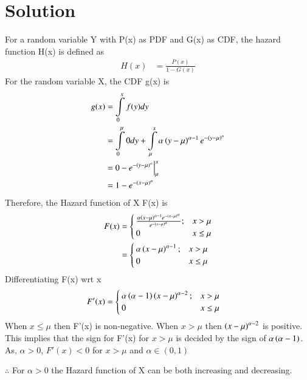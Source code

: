 \documentclass[journal,12pt,twocolumn]{IEEEtran}
\begin{document}
\section*{Solution}
\newcommand{\Integral}[2]{\ensuremath{\int\limits_{#1}^{#2}}}
For a random variable Y with P(x) as PDF and G(x) as CDF, the hazard function H(x) is defined as
\begin{align}
    H(x)&=\frac{P(x)}{1-G(x)}\nonumber
\end{align}
For the random variable X, the CDF g(x) is
\begin{align}
    g(x)&=\Integral{0}{x}f(y)dy\\
        &=\Integral{0}{\mu}0 dy +\Integral{\mu}{x}\alpha\brak{y-\mu}^{\alpha -1}e^{-\brak{y-\mu}^\alpha}\\
        &=0 -e^{-\brak{y-\mu}^\alpha}\Big|_{\mu}^{x}\\
        &=1-e^{-\brak{x-\mu}^{\alpha}}
\end{align}
Therefore, the Hazard function of X F(x) is
\begin{align}
    F(x)&=\begin{cases}\frac{\alpha\left(x-\mu\right)^{\alpha -1}e^{-\left(x-\mu\right)^\alpha}}{e^{-\left(x-\mu\right)^{\alpha}}};&x>\mu\\
                        0                               &x\leq\mu   
    \end{cases}\nonumber\\
    &=\begin{cases}\alpha\left(x-\mu\right)^{\alpha -1};&x>\mu\\
                        0                            &x\leq\mu   
    \end{cases}\nonumber
\end{align}
Differentiating F(x) wrt x
\begin{align}
    F'(x)&=\begin{cases}\alpha\left(\alpha - 1\right)\left(x-\mu\right)^{\alpha -2};&x>\mu\\
                        0                            &x\leq\mu   
    \end{cases}\nonumber
\end{align}
When $x\leq \mu$ then F'(x) is non-negative. When $x>\mu$ then $\left(x-\mu\right)^{\alpha -2}$ is positive. This implies that the sign for F'(x) for $x>\mu$ is decided by the sign of $\alpha\left(\alpha -1\right)$. As, $\alpha > 0$, $F'(x)<0$ for $x>\mu$ and $\alpha \in (0,1)$ 

\bigskip
$\therefore$ For $\alpha>0$ the Hazard function of X can be both increasing and decreasing.

\vspace{0.5cm}\centering {}
\end{document}
